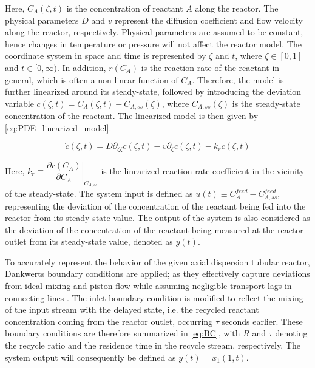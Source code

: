 Here, $C_A(\zeta, t)$ is the concentration of reactant $A$ along the reactor. The physical parameters $D$ and $v$ represent the diffusion coefficient and flow velocity along the reactor, respectively. Physical parameters are assumed to be constant, hence changes in temperature or pressure will not affect the reactor model. The coordinate system in space and time is represented by $\zeta$ and $t$, where $\zeta \in [0, 1]$ and $t \in [0, \infty)$. In addition, $r(C_A)$ is the reaction rate of the reactant in general, which is often a non-linear function of $C_A$. Therefore, the model is further linearized around its steady-state, followed by introducing the deviation variable $c(\zeta, t) = C_A(\zeta, t) - C_{A, ss}(\zeta)$, where $C_{A, ss}(\zeta)$ is the steady-state concentration of the reactant. The linearized model is then given by \eqref{eq:PDE_linearized_model}.

\begin{equation} \label{eq:PDE_linearized_model}
    \dot{c}(\zeta, t) = D \partial_{\zeta \zeta} c(\zeta, t) - v \partial_\zeta c(\zeta, t) - k_r c(\zeta, t)
\end{equation}

Here, $k_r \equiv \left. \dfrac{\partial r(C_A)}{\partial C_A} \right|_{C_{A, ss}}$ is the linearized reaction rate coefficient in the vicinity of the steady-state. The system input is defined as $u(t) \equiv C_{A}^{feed} - C_{A, ss}^{feed}$, representing the deviation of the concentration of the reactant being fed into the reactor from its steady-state value. The output of the system is also considered as the deviation of the concentration of the reactant being measured at the reactor outlet from its steady-state value, denoted as $y(t)$. 

To accurately represent the behavior of the given axial dispersion tubular reactor, Dankwerts boundary conditions are applied; as they effectively capture deviations from ideal mixing and piston flow while assuming negligible transport lags in connecting lines \cite{danckwerts1993continuous}.
The inlet boundary condition is modified to reflect the mixing of the input stream with the delayed state, i.e. the recycled reactant concentration coming from the reactor outlet, occurring $\tau$ seconds earlier.
These boundary conditions are therefore summarized in \eqref{eq:BC}, with $R$ and $\tau$ denoting the recycle ratio and the residence time in the recycle stream, respectively. The system output will consequently be defined as $y(t) = x_1(1, t)$. 

